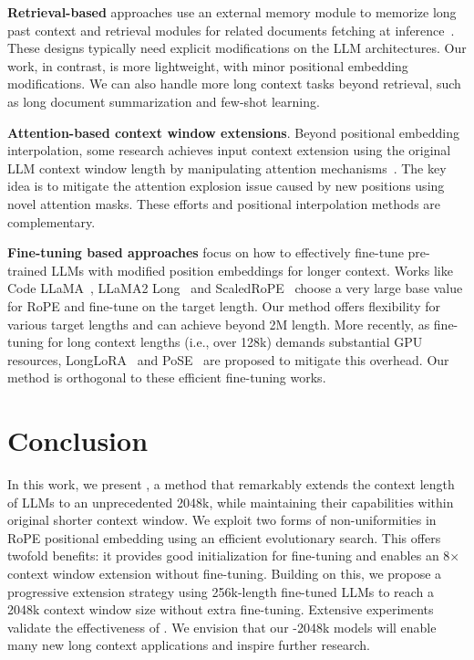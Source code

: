 \documentclass{article}
\theoremstyle{plain}
\theoremstyle{definition}
\theoremstyle{remark}
\begin{document}
\noindent\textbf{Retrieval-based} approaches  use an external memory module to memorize long past context and retrieval modules for related documents fetching at inference~\cite{longllama,wang2023augmenting,borgeaud2022improving}. These designs typically need explicit modifications on the LLM architectures. Our work, in contrast, is more lightweight, with minor positional embedding modifications. We can also handle more long context tasks beyond retrieval, such as long document summarization and few-shot learning. 


\noindent\textbf{Attention-based context window extensions}. Beyond positional embedding interpolation, some research achieves input context extension using the original LLM context window length by manipulating attention mechanisms~\cite{han2023lminfinite, streamingllm,parallelwindow}. The key idea is to mitigate the attention explosion issue caused by new positions using novel attention masks. 
These efforts and positional interpolation methods are  complementary.






\noindent\textbf{Fine-tuning based approaches} focus on how  to effectively fine-tune pre-trained LLMs with modified position embeddings for longer context. Works like Code LLaMA~\cite{codellama}, LLaMA2 Long~\cite{xiong2023effective} and ScaledRoPE~\cite{liu2023scaling} choose a very large base value for RoPE and fine-tune on the target length. Our method offers flexibility for various target lengths and can achieve beyond 2M length.  More recently, as fine-tuning for long context lengths (i.e., over 128k) demands substantial GPU resources,  LongLoRA~\cite{longlora} and PoSE~\cite{zhu2023pose} are proposed to mitigate this overhead. 
Our method is orthogonal to these efficient fine-tuning works.

	
\vspace{-1ex}
\section{Conclusion}
\vspace{-1ex}
In this work, we present {\sysname}, a method that remarkably extends the context length of LLMs to an unprecedented 2048k, while maintaining their  capabilities within original shorter context window. We exploit two forms of non-uniformities in RoPE positional embedding using an efficient evolutionary search. This  offers twofold benefits: it provides good  initialization for fine-tuning and enables an 8$\times$ context window extension without fine-tuning. Building on this, we  propose a progressive extension strategy using 256k-length fine-tuned LLMs to reach a 2048k context window size without extra fine-tuning. Extensive experiments validate the effectiveness of {\sysname}. We envision that our {\sysname}-2048k models will enable many new long context applications and inspire further research. 
\end{document}
